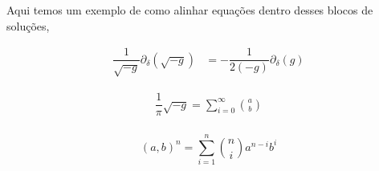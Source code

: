\begin{solution}[I]
    Aqui temos um exemplo de como alinhar equações dentro desses blocos de soluções,

    \begin{align}
        \dfrac{1}{\sqrt{-g}}\partial_{\delta}(\sqrt{-g}) & = -\dfrac{1}{2(-g)}\partial_{\delta}(g) \label{eq: 2}
    \end{align}

    \begin{align}
        \dfrac{1}{\pi}{\sqrt{-g}} = \sum_{i=0}^{\infty} \binom{a}{b} \\
    \end{align}

    \begin{equation*}
        (a, b)^n = \sum_{i=1}^{n} \binom{n}{i} a^{n-i} b^i
    \end{equation*}
\end{solution}
